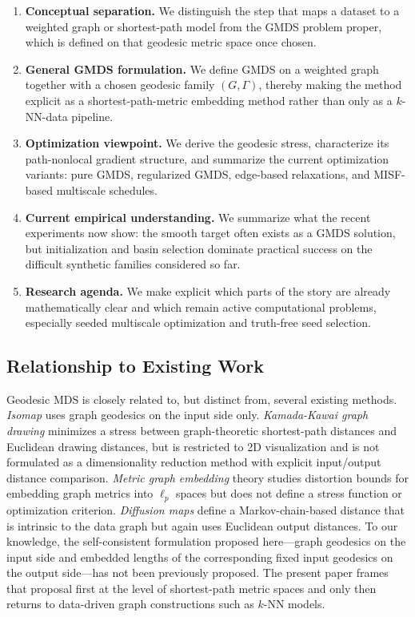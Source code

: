\documentclass[twoside,11pt]{article}
\begin{document}
\begin{enumerate}
  \item \textbf{Conceptual separation.} We distinguish the step that maps a
  dataset to a weighted graph or shortest-path model from the GMDS problem
  proper, which is defined on that geodesic metric space once chosen.

  \item \textbf{General GMDS formulation.} We define GMDS on a weighted
  graph together with a chosen geodesic family $(G,\Gamma)$, thereby making
  the method explicit as a shortest-path-metric embedding method rather than
  only as a $k$-NN-data pipeline.

  \item \textbf{Optimization viewpoint.} We derive the geodesic stress,
  characterize its path-nonlocal gradient structure, and summarize the
  current optimization variants: pure GMDS, regularized GMDS, edge-based
  relaxations, and MISF-based multiscale schedules.

  \item \textbf{Current empirical understanding.} We summarize what the
  recent experiments now show: the smooth target often exists as a GMDS
  solution, but initialization and basin selection dominate practical
  success on the difficult synthetic families considered so far.

  \item \textbf{Research agenda.} We make explicit which parts of the story
  are already mathematically clear and which remain active computational
  problems, especially seeded multiscale optimization and truth-free seed
  selection.
\end{enumerate}

\subsection{Relationship to Existing Work}

Geodesic MDS is closely related to, but distinct from, several existing
methods.  \emph{Isomap} \citep{tenenbaum2000global} uses graph geodesics
on the input side only.  \emph{Kamada-Kawai graph drawing}
\citep{kamada1989algorithm} minimizes a stress between graph-theoretic
shortest-path distances and Euclidean drawing distances, but is restricted
to 2D visualization and is not formulated as a dimensionality reduction
method with explicit input/output distance comparison.  \emph{Metric graph
embedding} theory \citep{bourgain1985lipschitz,
linial1994geometry} studies distortion bounds for embedding graph metrics
into $\ell_p$ spaces but does not define a stress function or optimization
criterion.  \emph{Diffusion maps} \citep{coifman2006diffusion} define a
Markov-chain-based distance that is intrinsic to the data graph but again
uses Euclidean output distances.  To our knowledge, the self-consistent
formulation proposed here---graph geodesics on the input side and
embedded lengths of the corresponding fixed input geodesics on the output
side---has not been previously proposed.  The present paper frames that
proposal first at the level of shortest-path metric spaces and only then
returns to data-driven graph constructions such as $k$-NN models.
\end{document}
